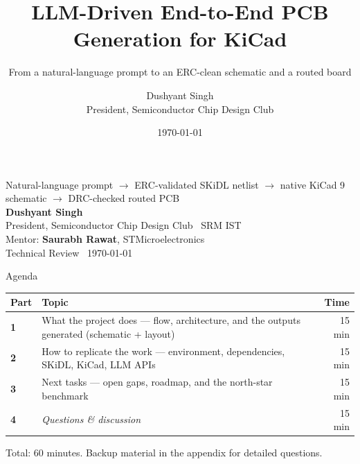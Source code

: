 \documentclass[aspectratio=169,10pt]{beamer}
\title{\textbf{LLM-Driven End-to-End PCB Generation for KiCad}}
\subtitle{From a natural-language prompt to an ERC-clean schematic and a routed board}
\author{Dushyant Singh\\[2pt]{\small President, Semiconductor Chip Design Club}}
\institute{\small SRM Institute of Science and Technology\\[2pt]
           \scriptsize Mentor: Saurabh Rawat, STMicroelectronics}
\date{\small\today}
\begin{document}
{
\begin{frame}[plain]
  \vspace{2mm}
  \begin{center}
  \end{center}
  \vspace{1mm}
  \begin{center}
  {\small Natural-language prompt $\rightarrow$ ERC-validated SKiDL netlist $\rightarrow$ native KiCad 9 schematic $\rightarrow$ DRC-checked routed PCB}\\[6mm]
  {\normalsize\textbf{Dushyant Singh}}\\[2pt]
  {\footnotesize President, Semiconductor Chip Design Club \textbullet\ SRM IST}\\[4mm]
  {\footnotesize Mentor: \textbf{Saurabh Rawat}, STMicroelectronics}\\[6mm]
  {\scriptsize\color{stgrey}Technical Review \textbullet\ \today}
  \end{center}
\end{frame}}

\begin{frame}{Agenda}
\vspace{1mm}
\begin{center}
\begin{tabular}{@{}p{} p{} r@{}}
\toprule
\textbf{Part} & \textbf{Topic} & \textbf{Time} \\
\midrule
\textbf{1} & What the project does --- flow, architecture, and the outputs generated (schematic + layout) & 15 min \\[3pt]
\textbf{2} & How to replicate the work --- environment, dependencies, SKiDL, KiCad, LLM APIs & 15 min \\[3pt]
\textbf{3} & Next tasks --- open gaps, roadmap, and the north-star benchmark & 15 min \\[3pt]
\textbf{4} & \textit{Questions \& discussion} & 15 min \\
\bottomrule
\end{tabular}
\end{center}
\vspace{3mm}
\begin{center}
\footnotesize\color{stgrey}
Total: 60 minutes. Backup material in the appendix for detailed questions.
\end{center}
\end{frame}
\end{document}
